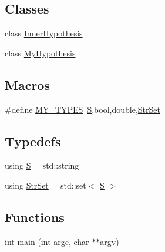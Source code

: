 \subsection*{Classes}
\begin{DoxyCompactItemize}
\item 
class \hyperlink{class_inner_hypothesis}{Inner\+Hypothesis}
\item 
class \hyperlink{class_my_hypothesis}{My\+Hypothesis}
\end{DoxyCompactItemize}
\subsection*{Macros}
\begin{DoxyCompactItemize}
\item 
\#define \hyperlink{_formal_language_theory-_complex_2_main_8cpp_a9982c6df11148a7d221b1839f38633a5}{M\+Y\+\_\+\+T\+Y\+P\+ES}~\hyperlink{_formal_language_theory-_complex_2_main_8cpp_a51c40915539205f0b5add30b0d68a4cb}{S},bool,double,\hyperlink{_formal_language_theory-_complex_2_main_8cpp_a809d982ed20fa378f251596c3b5ad6b7}{Str\+Set}
\end{DoxyCompactItemize}
\subsection*{Typedefs}
\begin{DoxyCompactItemize}
\item 
using \hyperlink{_formal_language_theory-_complex_2_main_8cpp_a51c40915539205f0b5add30b0d68a4cb}{S} = std\+::string
\item 
using \hyperlink{_formal_language_theory-_complex_2_main_8cpp_a809d982ed20fa378f251596c3b5ad6b7}{Str\+Set} = std\+::set$<$ \hyperlink{_formal_language_theory-_complex_2_main_8cpp_a51c40915539205f0b5add30b0d68a4cb}{S} $>$
\end{DoxyCompactItemize}
\subsection*{Functions}
\begin{DoxyCompactItemize}
\item 
int \hyperlink{_formal_language_theory-_complex_2_main_8cpp_a3c04138a5bfe5d72780bb7e82a18e627}{main} (int argc, char $\ast$$\ast$argv)
\end{DoxyCompactItemize}
